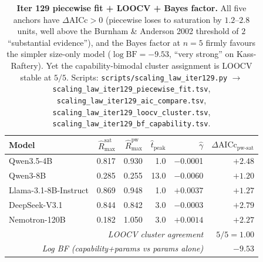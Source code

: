 \begin{table}[t]
  \centering
  \small
  \begin{tabular}{lrrrrr}
    \toprule
    Model & $\hat R_{\max}^{\text{sat}}$ &
           $\hat R_{\max}^{\text{pw}}$ &
           $\hat t_\mathrm{peak}$ & $\hat\gamma$ &
           $\Delta\text{AICc}_\text{pw-sat}$ \\
    \midrule
    Qwen3.5-4B             & 0.817 & 0.930 & 1.0 & $-$0.0001 & $+2.48$ \\
    Qwen3-8B               & 0.285 & 0.255 & 13.0 & $-$0.0060 & $+1.20$ \\
    Llama-3.1-8B-Instruct  & 0.869 & 0.948 & 1.0 & $+0.0037$ & $+1.27$ \\
    DeepSeek-V3.1          & 0.844 & 0.842 & 3.0 & $-$0.0003 & $+2.79$ \\
    Nemotron-120B          & 0.182 & 1.050 & 3.0 & $+0.0014$ & $+2.27$ \\
    \midrule
    \multicolumn{5}{r}{\emph{LOOCV cluster agreement}} & $5/5 = 1.00$ \\
    \multicolumn{5}{r}{\emph{Log BF (capability+params vs params alone)}} & $-9.53$ \\
    \bottomrule
  \end{tabular}
  \caption{\textbf{Iter 129 piecewise fit + LOOCV + Bayes factor.}
    All five anchors have $\Delta\text{AICc} > 0$ (piecewise loses
    to saturation by $1.2$--$2.8$ units, well above the Burnham \&
    Anderson 2002 threshold of $2$ ``substantial evidence''), and
    the Bayes factor at $n=5$ firmly favours the simpler
    size-only model ($\log \mathrm{BF} = -9.53$, ``very strong''
    on Kass-Raftery).  Yet the capability-bimodal cluster
    assignment is LOOCV stable at $5/5$.  Scripts:
    \texttt{scripts/scaling\_law\_iter129.py} $\to$
    \texttt{scaling\_law\_iter129\_piecewise\_fit.tsv},
    \texttt{scaling\_law\_iter129\_aic\_compare.tsv},
    \texttt{scaling\_law\_iter129\_loocv\_cluster.tsv},
    \texttt{scaling\_law\_iter129\_bf\_capability.tsv}.}
  \label{tab:scaling-iter129-fit}
\end{table}

